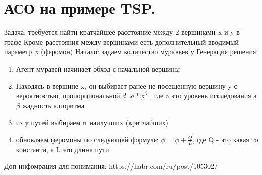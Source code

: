 \section{АСО на примере TSP.}
Задача: требуется найти кратчайшее расстояние между 2 вершинами x и y в графе
Кроме расстояния между вершинами есть дополнительный вводимый параметр $\phi$ (феромон)
Начало: задаем количество муравьев y 
Генерация решения:
\begin{enumerate} 
	\item Агент-муравей начинает обход с начальной вершины
	\item Находясь в вершине x, он выбирает ранее не посещенную вершину y с вероятностью, пропорциональной $d^-a * \phi^\beta$ , где a это уровень исследования а $\beta$ жадность алгоритма
	\item из y путей выбираем n наилучших (критчайших)
	\item обновляем феромоны по следующей формуле: $\phi = \phi +  \frac{Q}{L}$, где Q - это какая то константа, а L это длина пути
\end{enumerate}
Доп инфомрация для понимания: https://habr.com/ru/post/105302/

